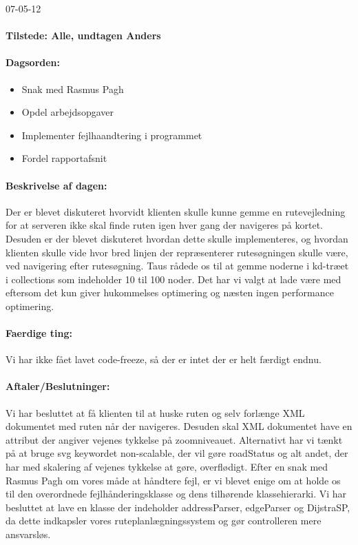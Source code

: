 \documentclass[a4paper,10pt,titlepage]{article}
\begin{document}
\begin{center}
		07-05-12
		\end{center}
		
		\paragraph{Tilstede: Alle, undtagen Anders}
		\paragraph{Dagsorden:}
		\begin{itemize}
					\item Snak med Rasmus Pagh
					\item Opdel arbejdsopgaver
					\item Implementer fejlhaandtering i programmet
					\item Fordel rapportafsnit
		\end{itemize}
		
		\paragraph{Beskrivelse af dagen:}
		Der er blevet diskuteret hvorvidt klienten skulle kunne gemme en rutevejledning for at serveren ikke skal finde ruten igen hver gang der navigeres på kortet. Desuden er der blevet diskuteret hvordan dette skulle implementeres, og hvordan klienten skulle vide hvor bred linjen der repræsenterer rutesøgningen skulle være, ved navigering efter rutesøgning. 
Taus rådede os til at gemme noderne i kd-træet i collections som indeholder 10 til 100 noder. Det har vi valgt at lade være med eftersom det kun giver hukommelses optimering og næsten ingen performance optimering. 

		\paragraph{Faerdige ting:}
		Vi har ikke fået lavet code-freeze, så der er intet der er helt færdigt endnu.
		\paragraph{Aftaler/Beslutninger:}
		Vi har besluttet at få klienten til at huske ruten og selv forlænge XML dokumentet med ruten når der navigeres. Desuden skal XML dokumentet have en attribut der angiver vejenes tykkelse på zoomniveauet. Alternativt har vi tænkt på at bruge svg keywordet non-scalable, der vil gøre roadStatus og alt andet, der har med skalering af vejenes tykkelse at gøre, overflødigt. 
Efter en snak med Rasmus Pagh om vores måde at håndtere fejl, er vi blevet enige om at holde os til den overordnede fejlhånderingsklasse og dens tilhørende klassehierarki. 
Vi har besluttet at lave en klasse der indeholder addressParser, edgeParser og DijstraSP, da dette indkapsler vores ruteplanlægningssystem og gør controlleren mere ansvarsløs.
 
\end{document}
